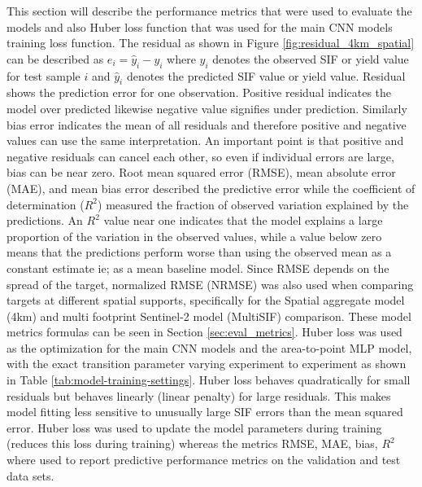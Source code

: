 This section will describe the performance metrics that were used to evaluate the models and also Huber loss function that was used for the main CNN models training loss function. The residual as shown in Figure \ref{fig:residual_4km_spatial} can be described as $e_i=\widehat{y}_i-y_i$ where $y_i$ denotes the observed SIF or yield value for test sample $i$ and $\widehat{y}_i$ denotes the predicted SIF value or yield value. Residual shows the prediction error for one observation. Positive residual indicates the model over predicted likewise negative value signifies under prediction. Similarly bias error indicates the mean of all residuals and therefore positive and negative values can use the same interpretation. An important point  is that positive and negative residuals can cancel each other, so even if individual errors are large, bias can be near zero. Root mean squared error (RMSE), mean absolute error (MAE), and mean bias error described the predictive error while the coefficient of determination ($R^2$) measured the fraction of observed variation explained by the predictions. An $R^2$ value near one indicates that the model explains a large proportion of the variation in the observed values, while a value below zero means that the predictions perform worse than using the observed mean as a constant estimate ie; as a mean baseline model. Since RMSE depends on the spread of the target, normalized RMSE (NRMSE) was also used when comparing targets at different spatial supports, specifically for the Spatial aggregate model (4km) and multi footprint Sentinel-2 model (MultiSIF) comparison. These model metrics formulas can be seen in Section \ref{sec:eval_metrics}. Huber loss was used as the optimization for the main CNN models and the area-to-point MLP model, with the exact transition parameter varying experiment to experiment as shown in Table \ref{tab:model-training-settings}. Huber loss behaves quadratically for small residuals but behaves linearly (linear penalty) for large residuals. This makes model fitting less sensitive to unusually large SIF errors than the mean squared error. Huber loss was used to update the model parameters during training (reduces this loss during training) whereas the metrics RMSE, MAE, bias, $R^2$ where used to report predictive performance metrics on the validation and test data sets.


